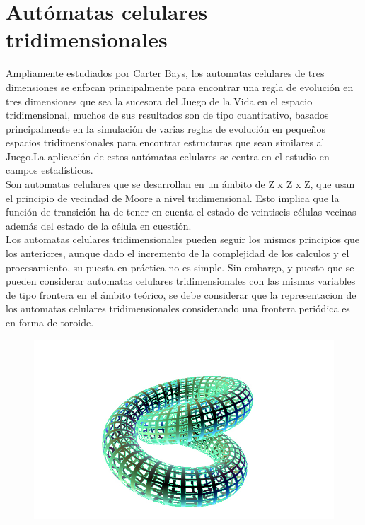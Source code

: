 \documentclass[11pt]{article}
\begin{document}
\clearpage

\section{Autómatas celulares tridimensionales}

Ampliamente estudiados por Carter Bays, los automatas celulares de tres dimensiones se enfocan principalmente para encontrar una regla de evolución en tres dimensiones que sea la sucesora del Juego de la Vida en el espacio tridimensional, muchos de sus resultados son de tipo cuantitativo, basados principalmente en la simulación de varias reglas de evolución en pequeños espacios tridimensionales para encontrar estructuras que sean similares al Juego.La aplicación de estos autómatas celulares se centra en el estudio en campos estadísticos.\\

Son automatas celulares que se desarrollan en un ámbito de Z x Z x Z, que usan el principio de vecindad de Moore a nivel tridimensional. Esto implica que la función de transición ha de tener en cuenta el estado de veintiseis células vecinas además del estado de la célula en cuestión.\\

Los automatas celulares tridimensionales pueden seguir los mismos principios que los anteriores, aunque dado el incremento de la complejidad de los calculos y el procesamiento, su puesta en práctica no es simple. Sin embargo, y puesto que se pueden considerar automatas celulares tridimensionales con las mismas variables de tipo frontera en el ámbito teórico, se debe considerar que la representacion de los automatas celulares tridimensionales considerando una frontera periódica es en forma de toroide. 

\begin{figure}[htp]
\centering
\includegraphics[width=8.5	cm]{10.jpg}
\label{fig:lion}
\end{figure}

\clearpage
\end{document}
